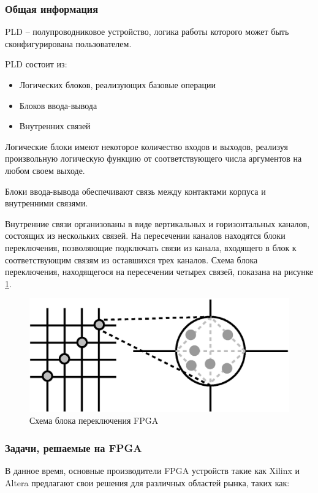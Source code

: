 \subsubsection{Общая информация}
PLD -- полупроводниковое устройство, логика работы которого может быть
сконфигурирована пользователем.

PLD состоит из:
\begin{itemize}
  \item Логических блоков, реализующих базовые операции
  \item Блоков ввода-вывода
  \item Внутренних связей
\end{itemize}

Логические блоки имеют некоторое количество входов и выходов, реализуя
произвольную логическую функцию от соответствующего числа аргументов на любом
своем выходе.

Блоки ввода-вывода обеспечивают связь между контактами корпуса и внутренними
связями.

Внутренние связи организованы в виде вертикальных и горизонтальных каналов,
состоящих из нескольких связей. На пересечении каналов находятся блоки
переключения, позволяющие подключать связи из канала, входящего в блок к
соответствующим связям из оставшихся трех каналов. Схема блока переключения,
находящегося на пересечении четырех связей, показана на рисунке \ref{fpga-cell}.

\begin{figure}
\includegraphics [width=\textwidth]{pictures/cell}
\caption{Схема блока переключения FPGA}
\label{fpga-cell}
\end{figure}

\subsubsection{Задачи, решаемые на FPGA}

В данное время, основные производители FPGA устройств такие как Xilinx и Altera
предлагают свои решения для различных областей рынка, таких как:

